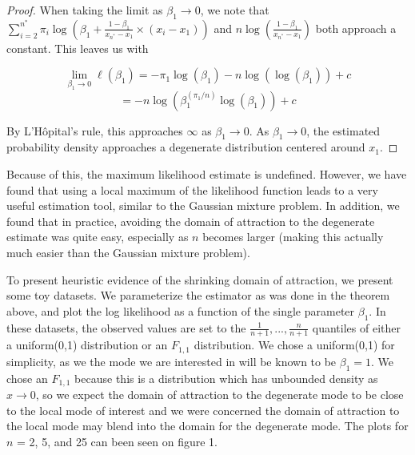 \documentclass[11pt]{article}
\numberwithin{equation}{section}
\begin{document}
\begin{proof}
	When taking the limit as $\beta_1 \rightarrow 0$, we note that $\displaystyle \sum_{i = 2}^{n^*} \pi_i \log \left( \beta_1 + \frac{1 - \beta_1} {x_{n^*} - x_1} \times (x_i - x_1) \right) $ and $n\log \left( \frac {1 - \beta_1} {x_{n^*} - x_1} \right)$ both approach a constant.  This leaves us with 
	
	\[
	\underset{\beta_1 \rightarrow 0} \lim \ell(\beta_1) = - \pi_1 \log(\beta_1) - n\log( \log(\beta_1)  ) + c
	\]
	\[
	 = - n\log( \beta_1^{(\pi_1/n)} \log(\beta_1)  ) + c
	\]
	
	By L'H\^opital's rule, this approaches $\infty$ as $\beta_1 \rightarrow 0$. As $\beta_1 \rightarrow 0$, the estimated probability density approaches a degenerate distribution centered around $x_1$. 
	
	\end{proof}

	Because of this, the maximum likelihood estimate is undefined. However, we have found that using a local maximum of the likelihood function leads to a very useful estimation tool, similar to the Gaussian mixture problem. In addition, we found that in practice, avoiding the domain of attraction to the degenerate estimate was quite easy, especially as $n$ becomes larger (making this actually much easier than the Gaussian mixture problem). 

	To present heuristic evidence of the shrinking domain of attraction, we present some toy datasets. We parameterize the estimator as was done in the theorem above, and plot the log likelihood as a function of the single parameter $\beta_1$. In these datasets, the observed values are set to the $\frac{1}{n+1}, ... ,\frac{n}{n+1}$ quantiles of either a uniform(0,1) distribution or an $F_{1,1}$ distribution. We chose a uniform(0,1) for simplicity, as we the mode we are interested in will be known to be $\beta_1 = 1$. We chose an $F_{1,1}$ because this is a distribution which has unbounded density as $x \rightarrow 0$, so we expect the domain of attraction to the degenerate mode to be close to the local mode of interest and we were concerned the domain of attraction to the local mode may blend into the domain for the degenerate mode. The plots for $n$ = 2, 5, and 25 can been seen on figure 1.
	
\end{document}
